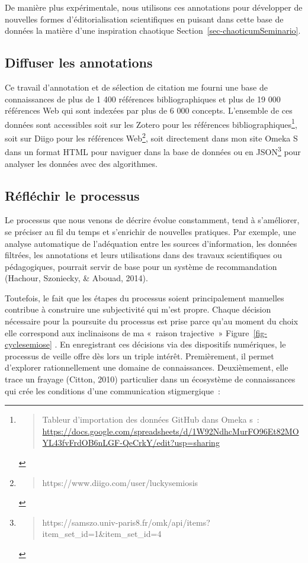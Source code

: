 \documentclass[
  a4paper,
  DIV=11,
  numbers=noendperiod]{scrreprt}
\begin{document}
De manière plus expérimentale, nous utilisons ces annotations pour
développer de nouvelles formes d'éditorialisation scientifiques en
puisant dans cette base de données la matière d'une inspiration
chaotique Section~\ref{sec-chaoticumSeminario}.

\subsection{Diffuser les annotations}\label{sec-diffuserAnnotations}

Ce travail d'annotation et de sélection de citation me fourni une base
de connaissances de plus de 1 400 références bibliographiques et plus de
19 000 références Web qui sont indexées par plus de 6 000 concepts.
L'ensemble de ces données sont accessibles soit sur les Zotero pour les
références bibliographiques\footnote{\begin{quote}
  Tableur d'importation des données GitHub dans Omeka s~:
  \url{https://docs.google.com/spreadsheets/d/1W92NdhcMurFO96Et82MOYL43fvFrdOB6nLGF-QeCrkY/edit?usp=sharing}
  \end{quote}}, soit sur Diigo pour les références Web\footnote{\begin{quote}
  https://www.diigo.com/user/luckysemiosis
  \end{quote}}, soit directement dans mon site Omeka S dans un format
HTML pour naviguer dans la base de données ou en JSON\footnote{\begin{quote}
  https://samszo.univ-paris8.fr/omk/api/items?item\_set\_id=1\&item\_set\_id=4
  \end{quote}} pour analyser les données avec des algorithmes.

\subsection{Réfléchir le processus}\label{sec-reflechirProcessus}

Le processus que nous venons de décrire évolue constamment, tend à
s'améliorer, se préciser au fil du temps et s'enrichir de nouvelles
pratiques. Par exemple, une analyse automatique de l'adéquation entre
les sources d'information, les données filtrées, les annotations et
leurs utilisations dans des travaux scientifiques ou pédagogiques,
pourrait servir de base pour un système de recommandation (Hachour,
Szoniecky, \& Abouad, 2014).

Toutefois, le fait que les étapes du processus soient principalement
manuelles contribue à construire une subjectivité qui m'est propre.
Chaque décision nécessaire pour la poursuite du processus est prise
parce qu'au moment du choix elle correspond aux inclinaisons de ma
«~raison trajective~» Figure~\ref{fig-cyclesemiose} . En enregistrant
ces décisions via des dispositifs numériques, le processus de veille
offre dès lors un triple intérêt. Premièrement, il permet d'explorer
rationnellement une domaine de connaissances. Deuxièmement, elle trace
un frayage (Citton, 2010) particulier dans un écosystème de
connaissances qui crée les conditions d'une communication stigmergique~:
\end{document}
